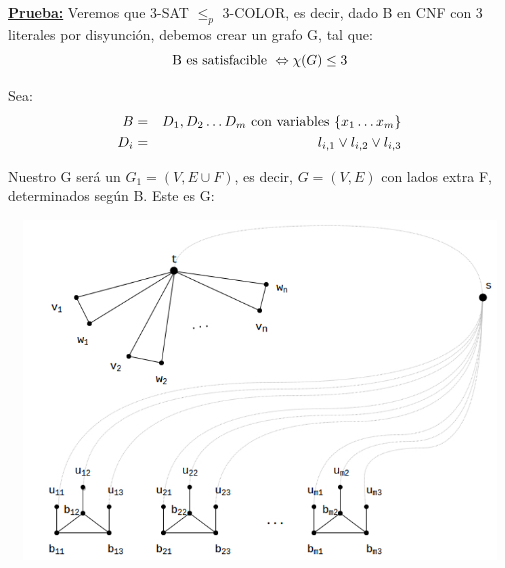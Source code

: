 \documentclass[12pt,a4paper]{report}
\begin{document}
		\textbf{\underline{Prueba:}} Veremos que 3-SAT $\leq_{p}$ 3-COLOR, es decir, dado B en CNF con 3 literales por disyunción, debemos crear un grafo G, tal que:
			\[ \textup{B es satisfacible } \Leftrightarrow \chi(G) \leq 3 \]
			\par Sea:
				\begin{eqnarray}
					\nonumber B &=& D_{1}, D_{2} \dotsc D_{m} \textup{ con variables } \lbrace x_{1} \dotsc x_{m} \rbrace \\
					\nonumber D_{i} &=& l_{i, 1} \vee l_{i, 2} \vee l_{i, 3}
				\end{eqnarray}
			
			\par Nuestro G será un $G_{1} = (V, E \cup F)$, es decir, $G = (V, E)$ con lados extra F, determinados según B. Este es G:
			
			\begin{center}
        			\includegraphics[width=14cm, height=9cm]{./graphics/3color_npcomplete.jpg}
			\end{center}
\end{document}
